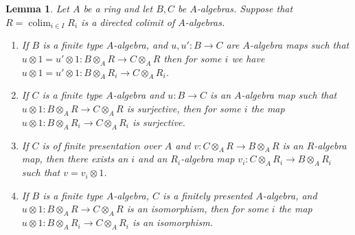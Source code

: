 \documentclass{amsart}
\theoremstyle{plain}
\newtheorem{lemma}[subsection]{Lemma}
\theoremstyle{definition}
\theoremstyle{remark}
\numberwithin{equation}{subsection}
\def\colim{\mathop{\mathrm{colim}}\nolimits}
\begin{document}
\begin{lemma}
\label{algebra-lemma-algebra-map-property-in-colimit}
Let $A$ be a ring and let $B, C$ be $A$-algebras.
Suppose that $R = \colim_{i \in I} R_i$ is a directed colimit
of $A$-algebras.
\begin{enumerate}
\item If $B$ is a finite type $A$-algebra, and $u, u' : B \to C$ are
$A$-algebra maps such that
$u \otimes 1 = u' \otimes 1 : B \otimes_A R \to C \otimes_A R$
then for some $i$ we have
$u \otimes 1 = u' \otimes 1 : B \otimes_A R_i \to C \otimes_A R_i$.
\item If $C$ is a finite type $A$-algebra and $u : B \to C$ is an
$A$-algebra map such that
$u \otimes 1 : B \otimes_A R \to C \otimes_A R$ is surjective, then
for some $i$ the map $u \otimes 1 : B \otimes_A R_i \to C \otimes_A R_i$
is surjective.
\item If $C$ is of finite presentation over $A$ and
$v : C \otimes_A R \to B \otimes_A R$ is an $R$-algebra map, then there
exists an $i$ and an $R_i$-algebra map
$v_i : C \otimes_A R_i \to B \otimes_A R_i$ such that
$v = v_i \otimes 1$.
\item If $B$ is a finite type $A$-algebra, $C$ is a finitely presented
$A$-algebra, and
$u \otimes 1 : B \otimes_A R \to C \otimes_A R$ is an isomorphism, then
for some $i$ the map $u \otimes 1 : B \otimes_A R_i \to C \otimes_A R_i$
is an isomorphism.
\end{enumerate}
\end{lemma}
\end{document}
